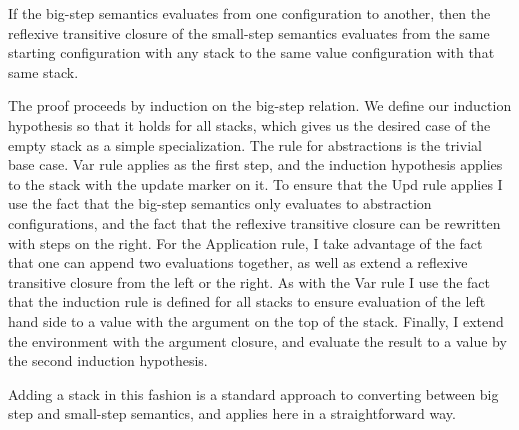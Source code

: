 \begin{lemma}
If the big-step semantics evaluates from one configuration to another, then the
reflexive transitive closure of the small-step semantics evaluates from the same
starting configuration with any stack to the same value configuration with that
same stack.
\end{lemma}
\begin{proofoutline}
The proof proceeds by induction on the big-step relation. We define our
induction hypothesis so that it holds for all stacks, which gives us the
desired case of the empty stack as a simple specialization. The rule for
abstractions is the trivial base case. Var rule applies as the first step, and
the induction hypothesis applies to the stack with the update marker on it. To
ensure that the Upd rule applies I use the fact that the big-step semantics
only evaluates to abstraction configurations, and the fact that the reflexive
transitive closure can be rewritten with steps on the right. For the Application
rule, I take advantage of the fact that one can append two evaluations together,
as well as extend a reflexive transitive closure from the left or the right. As
with the Var rule I use the fact that the induction rule is defined for all
stacks to ensure evaluation of the left hand side to a value with the argument
on the top of the stack. Finally, I extend the environment with the argument
closure, and evaluate the result to a value by the second induction hypothesis.
\end{proofoutline}

Adding a stack in this fashion is a standard approach to converting between big
step and small-step semantics, and applies here in a straightforward way. 
